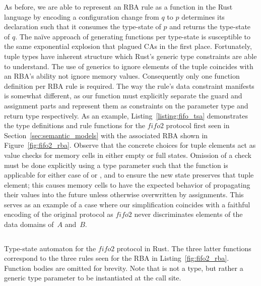 As before, we are able to represent an RBA rule as a function in the Rust language by encoding a configuration change from $q$ to $p$ determines its declaration such that it consumes the type-state of $p$ and returns the type-state of $q$. The na{\"i}ve approach of generating functions per type-state is susceptible to the same exponential explosion that plagued CAs in the first place. Fortunately, tuple types have inherent structure which Rust's generic type constraints are able to understand. The use of generics to ignore elements of the tuple coincides with an RBA's ability not ignore memory values. Consequently only one function definition per RBA rule is required. The way the rule's data constraint manifests is somewhat different, as our function must explicitly separate the guard and assignment parts and represent them as constraints on the parameter type and return type respectively. As an example, Listing~\ref{listing:fifo_tsa} demonstrates the type definitions and rule functions for the $fifo2$ protocol first seen in Section~\ref{sec:semantic_models} with the associated RBA shown in Figure~\ref{fig:fifo2_rba}. Observe that the concrete choices for tuple elements act as value checks for memory cells in either empty or full states. Omission of a check must be done explicitly using a type parameter such that the function is applicable for either case of  or , and to ensure the new state preserves that tuple element; this causes memory cells to have the expected behavior of propagating their values into the future unless otherwise overwritten by assignments. This serves as an example of a case where our simplification coincides with a faithful encoding of the original protocol as $fifo2$ never discriminates elements of the data domains of~$A$ and~$B$.


\begin{listing}[ht]
	\inputminted[]{rust}{fifo_tsa.rs}
	\caption[Type state automaton in Rust for the fifo2 connector.]{Type-state automaton for the $fifo2$ protocol in Rust. The three latter functions correspond to the three rules seen for the RBA in Listing~\ref{fig:fifo2_rba}. Function bodies are omitted for brevity. Note that  is not a type, but rather a generic type parameter to be instantiated at the call site.}
	\label{listing:fifo_tsa}
\end{listing}




